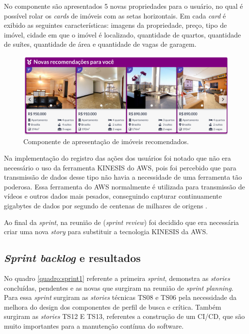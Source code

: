 No componente são apresentados 5 novas propriedades para o usuário, no qual é possível rolar os \textit{cards} de imóveis com as setas horizontais. Em cada \textit{card} é exibido as seguintes características: imagens da propriedade, preço, tipo de imóvel, cidade em que o imóvel é localizado, quantidade de quartos, quantidade de suítes, quantidade de área e quantidade de vagas de garagem.

\begin{figure}[H]
    \centering
    \includegraphics[scale=0.42]{figuras/desenvolvimento/componente_ml.png}
    \caption[Componente de apresentação de imóveis recomendados]{Componente de apresentação de imóveis recomendados.}
    \label{fig:componente_ml}
\end{figure}

Na implementação do registro das ações dos usuários foi notado que não era necessário o uso da ferramenta KINESIS do AWS, pois foi percebido que para transmissão de dados desse tipo não havia a necessidade de uma ferramenta tão poderosa. Essa ferramenta do AWS normalmente é utilizada para transmissão de vídeos e outros dados mais pesados, conseguindo capturar continuamente gigabytes de dados por segundo de centenas de milhares de origens \cite{KINESIS:2019}.

Ao final da \textit{sprint}, na reunião de (\textit{sprint review}) foi decidido que era necessária criar uma nova \textit{story} para substituir a tecnologia KINESIS da AWS.

\subsection{\textit{Sprint backlog} e resultados}

No quadro \ref{quadro:sprint1} referente a primeira \textit{sprint}, demonstra as \textit{stories} concluídas, pendentes e as novas que surgiram na reunião de \textit{sprint planning}. Para essa \textit{sprint} surgiram as \textit{stories} técnicas TS08 e TS06 pela necessidade da melhora do design dos componentes de perfil de busca e crítica. Também surgiram as \textit{stories} TS12 E TS13, referentes a construção de um CI/CD, que são muito importantes para a manutenção contínua do software.


